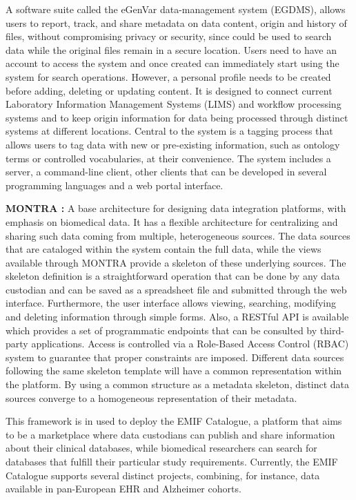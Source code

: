 A software suite called the eGenVar data-management system (EGDMS), allows users to
report, track, and share metadata on data content, origin and history of files, without
compromising privacy or security, since could be used to search data while the original
files remain in a secure location.
Users need to have an account to access the system and once created can immediately
start using the system for search operations.
However, a personal profile needs to be created before adding, deleting or updating
content.
It is designed to connect current Laboratory Information Management Systems (LIMS) and
workflow processing systems and to keep origin information for data being processed
through distinct systems at different locations.
Central to the system is a tagging process that allows users to tag data with new or
pre-existing information, such as ontology terms or controlled vocabularies, at their
convenience.
The system includes a server, a command-line client, other clients that can be
developed in several programming languages and a web portal interface.


\textbf{MONTRA \cite{montra}:}
A base architecture for designing data integration platforms, with emphasis on
biomedical data.
It has a flexible architecture for centralizing and sharing such data coming from
multiple, heterogeneous sources.
The data sources that are cataloged within the system contain the full data, while the
views available through MONTRA provide a skeleton of these underlying sources.
The skeleton definition is a straightforward operation that can be done by any data
custodian and can be saved as a spreadsheet file and submitted through the web
interface.
Furthermore, the user interface allows viewing, searching, modifying and deleting
information through simple forms.
Also, a RESTful API is available which provides a set of programmatic endpoints that
can be consulted by third-party applications.
Access is controlled via a Role-Based Access Control (RBAC) system to guarantee that
proper constraints are imposed.
Different data sources following the same skeleton template will have a common
representation within the platform.
By using a common structure as a metadata skeleton, distinct data sources converge to a
homogeneous representation of their metadata.

This framework is in used to deploy the EMIF Catalogue, a platform that aims to be a
marketplace where data custodians can publish and share information about their
clinical databases, while biomedical researchers can search for databases that fulfill
their particular study requirements.
Currently, the EMIF Catalogue supports several distinct projects, combining, for
instance, data available in pan-European EHR and Alzheimer cohorts.

